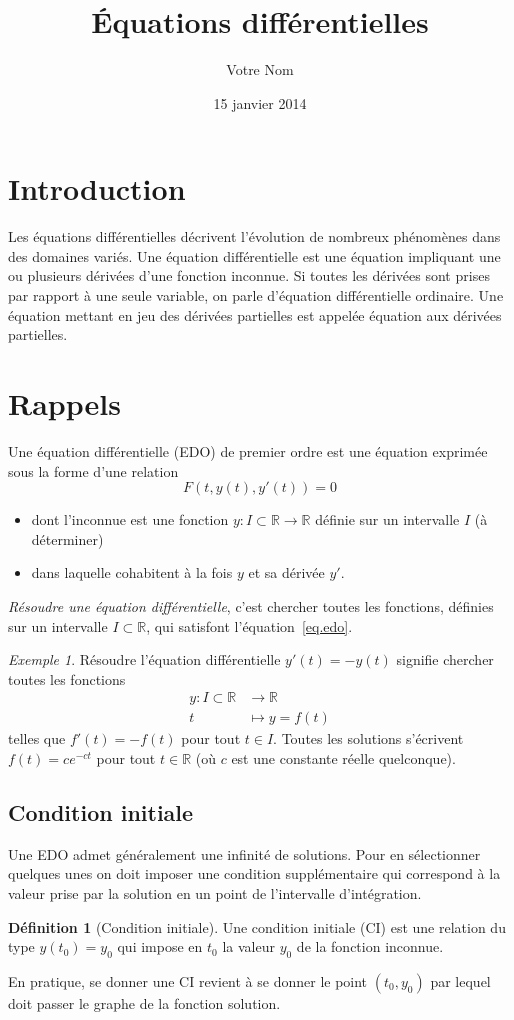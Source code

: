 \documentclass[a4paper,10pt]{scrartcl}
\title{Équations différentielles}
\author{Votre Nom}
\date{15 janvier 2014}
\theoremstyle{definition}
\newtheorem{defi}{Définition}[section]
\theoremstyle{remark}
\newtheorem*{exemple}{Exemple}
\theoremstyle{plain}
\newcommand{\ensemble}[1]{\mathbb{#1}}
\newcommand{\R}{\ensemble{R}}
\begin{document}
\maketitle
\tableofcontents


\section*{Introduction}
Les équations différentielles décrivent l'évolution de nombreux phénomènes dans des domaines variés. Une équation différentielle est une équation impliquant une ou plusieurs dérivées d'une fonction inconnue. Si toutes les dérivées sont prises par rapport à une seule variable, on parle d'équation différentielle ordinaire. Une équation mettant en jeu des dérivées partielles est appelée équation aux dérivées partielles.


\section{Rappels}
Une équation différentielle (EDO) de premier ordre est une équation exprimée sous la forme d'une relation 
\begin{equation}\label{eq.edo}
F(t,y(t),y'(t))=0
\end{equation}
\begin{itemize}
\item dont l'inconnue est une fonction $y\colon I\subset\R\to\R$ définie sur un intervalle $I$ (à déterminer)
\item dans laquelle cohabitent à la fois $y$ et sa dérivée $y'$.
\end{itemize}
\emph{Résoudre une équation différentielle}, c'est chercher toutes les fonctions, définies sur un intervalle $I\subset\R$, qui satisfont l'équation~\eqref{eq.edo}. 

\begin{exemple}
Résoudre l'équation différentielle $y'(t)=-y(t)$ signifie chercher toutes les fonctions
\begin{align*}
y\colon I\subset\R&\to\R\\
t&\mapsto y=f(t)
\end{align*}
telles que $f'(t)=-f(t)$ pour tout $t\in I$. Toutes les solutions s'écrivent $f(t)=ce^{-ct}$ pour tout $t\in\R$ (où $c$ est une constante réelle quelconque).  
\end{exemple}


\subsection{Condition initiale}
Une EDO admet généralement une infinité de solutions. Pour en sélectionner quelques unes on doit imposer une condition supplémentaire qui correspond à la valeur prise par la solution en un point de l'intervalle d'intégration. 
\begin{defi}[Condition initiale]
Une condition initiale (CI) est une relation du type $y(t_0)=y_0$ qui impose en $t_0$ la valeur $y_0$ de la fonction inconnue.
\end{defi}
En pratique, se donner une CI revient à se donner le point $(t_0,y_0)$ par lequel doit passer le graphe de la fonction solution.
\end{document}
